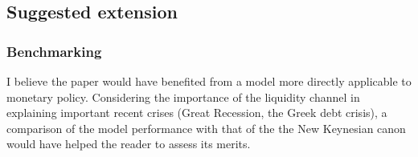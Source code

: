 \documentclass{amsart}
\theoremstyle{definition}
\theoremstyle{remark}
\numberwithin{equation}{section}
\begin{document}




\subsection*{Suggested extension}

\subsubsection*{Benchmarking}
I believe the paper would have benefited from a model more directly applicable to monetary policy. Considering the importance of the liquidity channel in explaining important recent crises (Great Recession, the Greek debt crisis), a comparison of the model performance with that of the the New Keynesian canon \citep{gali2015monetary} would have helped the reader to assess its merits.\\

\end{document}

